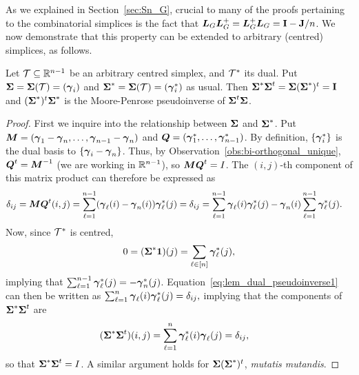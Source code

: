 As we explained in Section~\ref{sec:Sn_G}, crucial to many of the proofs pertaining to  the combinatorial  simplices is the fact that $\vb*{L}_G\vb*{L}_G^+=\vb*{L}_G^+\vb*{L}_G=\vb{I}-\vb{J}/n$. We now demonstrate that this property can be  extended  to arbitrary (centred)  simplices, as follows.



  

\begin{lemma}
	\label{lem:dual_pseudoinverse}
	Let $\mathcal{T}\subseteq\mathbb{R}^{n-1}$ be an arbitrary centred  simplex, and $\mathcal{T}^*$ its dual. Put $\boldsymbol{\Sigma}=\boldsymbol{\Sigma}(\mathcal{T})=(\vb*{\gamma}_i)$ and $\boldsymbol{\Sigma}^*=\boldsymbol{\Sigma}(\mathcal{T})=(\vb*{\gamma}_i^*)$ as usual. Then $\boldsymbol{\Sigma}^*\boldsymbol{\Sigma}^t = \boldsymbol{\Sigma}(\boldsymbol{\Sigma}^*)^t=\vb{I}$ and $(\boldsymbol{\Sigma}^*)^t\boldsymbol{\Sigma}^*$ is the Moore-Penrose pseudoinverse of $\boldsymbol{\Sigma}^t\boldsymbol{\Sigma}$. 
\end{lemma}
\begin{proof}
	First we inquire into the relationship between $\boldsymbol{\Sigma}$ and $\boldsymbol{\Sigma}^*$. Put ${\vb*{M}}=(\vb*{\gamma}_1-\vb*{\gamma}_n,\dots,\vb*{\gamma}_{n-1}-\vb*{\gamma}_n)$ and $\vb*{Q} = (\vb*{\gamma}^*_1,\dots,\vb*{\gamma}_{n-1}^*)$. By definition, $\{\vb*{\gamma}_i^*\}$ is the dual  basis to $\{\vb*{\gamma}_i-\vb*{\gamma}_n\}$. Thus, by Observation~\ref{obs:bi-orthogonal_unique}, $\vb*{Q}^t={\vb*{M}}^{-1}$ (we are working in $\mathbb{R}^{n-1}$), so  ${\vb*{M}}\vb*{Q}^t=I$. The $(i,j)$-th component of this matrix product can therefore be expressed as 
	\begin{align}
	\delta_{ij} = {\vb*{M}}\vb*{Q}^t(i,j) &= \sum_{\ell=1}^{n-1} (\vb*{\gamma}_\ell(i) - \vb*{\gamma}_n(i))\vb*{\gamma}_\ell^*(j) = \delta_{ij}= \sum_{\ell=1}^{n-1} \vb*{\gamma}_\ell(i)\vb*{\gamma}^*_\ell(j) - \vb*{\gamma}_n(i)\sum_{\ell=1}^{n-1}\vb*{\gamma}^*_\ell(j).\label{eq:lem_dual_pseudoinverse1}
	\end{align}
	Now,  since $\mathcal{T}^*$ is centred, 
	\begin{equation*}
	0=	(\boldsymbol{\Sigma}^*\vb{1})(j) = \sum_{\ell\in[n]} \vb*{\gamma}_\ell^*(j),
	\end{equation*}
	implying that $\sum_{\ell=1}^{n-1}\vb*{\gamma}_\ell^*(j) = - \vb*{\gamma}_n^*(j)$. Equation~\eqref{eq:lem_dual_pseudoinverse1} can then be written as 
	$
	\sum_{\ell=1}^{n} \vb*{\gamma}_\ell(i)\vb*{\gamma}_\ell^*(j)=\delta_{ij},
	$
	implying that the components of $\boldsymbol{\Sigma}^*\boldsymbol{\Sigma}^t$ are
	\begin{align*}
	(\boldsymbol{\Sigma}^*\boldsymbol{\Sigma}^t)(i,j) &= \sum_{\ell=1}^n \vb*{\gamma}_\ell^*(i)\vb*{\gamma}_\ell(j)=\delta_{ij},
	\end{align*}
	so that $\boldsymbol{\Sigma}^*\boldsymbol{\Sigma}^t=I$. A similar argument  holds for $\boldsymbol{\Sigma}(\boldsymbol{\Sigma}^*)^t$, \emph{mutatis mutandis}.  
	

\end{proof}
